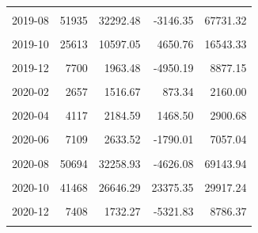 \begin{longtable}[t]{crrrr}
\cellcolor{gray!10}{2019-07} & \cellcolor{gray!10}{13394} & \cellcolor{gray!10}{5116.85} & \cellcolor{gray!10}{-1615.00} & \cellcolor{gray!10}{11848.70}\\
2019-08 & 51935 & 32292.48 & -3146.35 & 67731.32\\
\cellcolor{gray!10}{2019-09} & \cellcolor{gray!10}{53234} & \cellcolor{gray!10}{28434.23} & \cellcolor{gray!10}{-2013.36} & \cellcolor{gray!10}{58881.82}\\
2019-10 & 25613 & 10597.05 & 4650.76 & 16543.33\\
\cellcolor{gray!10}{2019-11} & \cellcolor{gray!10}{20585} & \cellcolor{gray!10}{10561.31} & \cellcolor{gray!10}{-9909.37} & \cellcolor{gray!10}{31031.99}\\
2019-12 & 7700 & 1963.48 & -4950.19 & 8877.15\\
\cellcolor{gray!10}{2020-01} & \cellcolor{gray!10}{2866} & \cellcolor{gray!10}{1015.64} & \cellcolor{gray!10}{-377.94} & \cellcolor{gray!10}{2409.22}\\
2020-02 & 2657 & 1516.67 & 873.34 & 2160.00\\
\cellcolor{gray!10}{2020-03} & \cellcolor{gray!10}{3880} & \cellcolor{gray!10}{3444.60} & \cellcolor{gray!10}{2345.37} & \cellcolor{gray!10}{4543.82}\\
2020-04 & 4117 & 2184.59 & 1468.50 & 2900.68\\
\cellcolor{gray!10}{2020-05} & \cellcolor{gray!10}{4002} & \cellcolor{gray!10}{1443.88} & \cellcolor{gray!10}{355.19} & \cellcolor{gray!10}{2532.56}\\
2020-06 & 7109 & 2633.52 & -1790.01 & 7057.04\\
\cellcolor{gray!10}{2020-07} & \cellcolor{gray!10}{15804} & \cellcolor{gray!10}{6793.96} & \cellcolor{gray!10}{1158.27} & \cellcolor{gray!10}{12429.65}\\
2020-08 & 50694 & 32258.93 & -4626.08 & 69143.94\\
\cellcolor{gray!10}{2020-09} & \cellcolor{gray!10}{69329} & \cellcolor{gray!10}{38748.29} & \cellcolor{gray!10}{17912.23} & \cellcolor{gray!10}{59584.35}\\
2020-10 & 41468 & 26646.29 & 23375.35 & 29917.24\\
\cellcolor{gray!10}{2020-11} & \cellcolor{gray!10}{13463} & \cellcolor{gray!10}{4360.17} & \cellcolor{gray!10}{-24429.82} & \cellcolor{gray!10}{33150.16}\\
2020-12 & 7408 & 1732.27 & -5321.83 & 8786.37\\
\cellcolor{gray!10}{2021-01} & \cellcolor{gray!10}{2237} & \cellcolor{gray!10}{582.74} & \cellcolor{gray!10}{-1096.89} & \cellcolor{gray!10}{2262.37}\\

\end{longtable}
